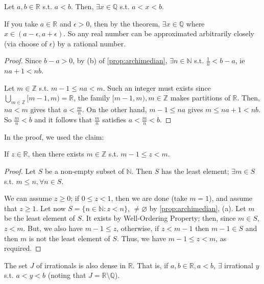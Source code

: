 \documentclass[12pt]{article}
\begin{document}
\begin{theorem}[Density]
  Let $a,b \in \mathbb{R}$ s.t. $a < b$. Then, $\exists x \in \mathbb{Q}$ s.t. $a < x < b$.
\end{theorem}

\begin{remark}
  If you take $a \in \mathbb{R}$ and $\epsilon > 0$, then by the theorem, $\exists x \in \mathbb{Q}$ where $x \in (a - \epsilon, a + \epsilon)$. So any real number can be approximated arbitrarily closely (via choose of $\epsilon$) by a rational number.
\end{remark}

\begin{proof}[Proof]
  Since $b - a > 0$, by (b) of \cref{prop:archimedian}, $\exists n \in \mathbb{N}$ s.t. $\frac{1}{n} < b -a$, ie $na + 1 < nb$.

  Let $m \in \mathbb{Z}$ s.t. $m - 1 \leq na < m$. Such an integer must exists since $\bigcup_{m \in \mathbb{Z}} [m-1, m) = \mathbb{R}$, the family $[m-1,m), m \in \mathbb{Z}$ makes partitions of $\mathbb{R}$. Then, $na < m$ gives that $a < \frac{m}{n}$. On the other hand, $m -1 \leq na$ gives $m \leq na+1 < nb$. So $\frac{m}{n} < b$ and it follows that $\frac{m}{n}$ satisfies $a < \frac{m}{n} < b$.
\end{proof}

In the proof, we used the claim:

\begin{proposition}
  If $z \in \mathbb{R}$, then there exists $m \in \mathbb{Z}$ s.t. $m - 1 \leq z < m$.
\end{proposition}

\begin{proof}[Proof]
  Let $S$ be a non-empty subset of $\mathbb{N}$. Then $S$ has the least element; $\exists m \in S$ s.t. $m \leq n, \forall n \in S$.

  We can assume $z \geq 0$; if $0 \leq z < 1$, then we are done (take $m = 1$), and assume that $z \geq 1$. Let now $S = \{n \in \mathbb{N} : z < n\}$, $\neq \varnothing$ by \cref{prop:archimedian}, (a). Let $m$ be the least element of $S$. It exists by Well-Ordering Property; then, since $m \in S$, $z < m$. But, we also have $m - 1 \leq z$, otherwise, if $z < m-1$ then $m - 1 \in S$ and then $m$ is not the least element of $S$. Thus, we have $m -1 \leq z < m$, as required.
\end{proof}

\begin{theorem}
  The set $J$ of irrationals is also dense in $\mathbb{R}$. That is, if $a,b \in \mathbb{R}, a < b$, $\exists$ irrational $y$ s.t. $a < y < b$ (noting that $J = \mathbb{R} \setminus \mathbb{Q}$).
\end{theorem}
\end{document}
